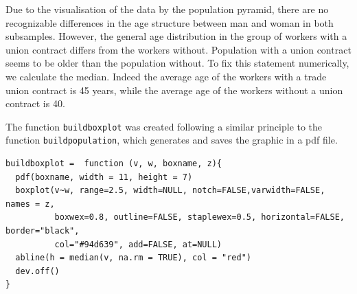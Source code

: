Due to the visualisation of the data by the population pyramid, there are no recognizable differences in the age structure between man and woman in both subsamples. However, the general age distribution in the group of workers with a union contract differs from the workers without. Population with a union contract seems to be older than the population without. To fix this statement numerically, we calculate the median. Indeed the average age of the workers with a trade union contract is 45 years, while the average age of the workers without a union contract is 40.

The function \texttt{buildboxplot} was created following a similar principle to the function \texttt{buildpopulation}, which generates and saves the graphic in a pdf file.
\lstset{firstnumber = 208}
\begin{lstlisting}
buildboxplot =  function (v, w, boxname, z){
  pdf(boxname, width = 11, height = 7)
  boxplot(v~w, range=2.5, width=NULL, notch=FALSE,varwidth=FALSE, names = z,
          boxwex=0.8, outline=FALSE, staplewex=0.5, horizontal=FALSE, border="black",
          col="#94d639", add=FALSE, at=NULL)
  abline(h = median(v, na.rm = TRUE), col = "red")
  dev.off()
}
\end{lstlisting}

